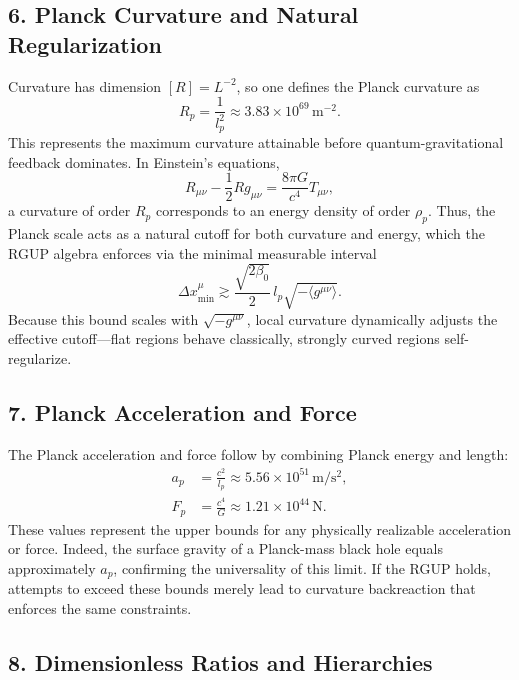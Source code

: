 \documentclass[11pt,oneside]{book}
\numberwithin{equation}{chapter}
\newcommand{\betaz}{\beta_0}
\begin{document}
\subsection*{6. Planck Curvature and Natural Regularization}

Curvature has dimension $[R] = L^{-2}$, so one defines the Planck curvature as
\begin{equation}
R_p = \frac{1}{l_p^2} \approx 3.83\times10^{69}\,\mathrm{m^{-2}}.
\end{equation}
This represents the maximum curvature attainable before quantum-gravitational feedback dominates.  
In Einstein’s equations,
\begin{equation}
R_{\mu\nu} - \frac{1}{2}R g_{\mu\nu}
= \frac{8\pi G}{c^4} T_{\mu\nu},
\end{equation}
a curvature of order $R_p$ corresponds to an energy density of order $\rho_p$.  
Thus, the Planck scale acts as a natural cutoff for both curvature and energy, which the RGUP algebra enforces via the minimal measurable interval
\begin{equation}
\Delta x_{\min}^\mu \gtrsim \frac{\sqrt{2\betaz}}{2}\,l_p\sqrt{-\langle g^{\mu\nu}\rangle}.
\end{equation}
Because this bound scales with $\sqrt{-g^{\mu\nu}}$, local curvature dynamically adjusts the effective cutoff—flat regions behave classically, strongly curved regions self-regularize.

\subsection*{7. Planck Acceleration and Force}

The Planck acceleration and force follow by combining Planck energy and length:
\begin{align}
a_p &= \frac{c^2}{l_p} \approx 5.56\times10^{51}\,\mathrm{m/s^2},\\
F_p &= \frac{c^4}{G} \approx 1.21\times10^{44}\,\mathrm{N}.
\end{align}
These values represent the upper bounds for any physically realizable acceleration or force.  
Indeed, the surface gravity of a Planck-mass black hole equals approximately $a_p$, confirming the universality of this limit.  
If the RGUP holds, attempts to exceed these bounds merely lead to curvature backreaction that enforces the same constraints.

\subsection*{8. Dimensionless Ratios and Hierarchies}
\end{document}
